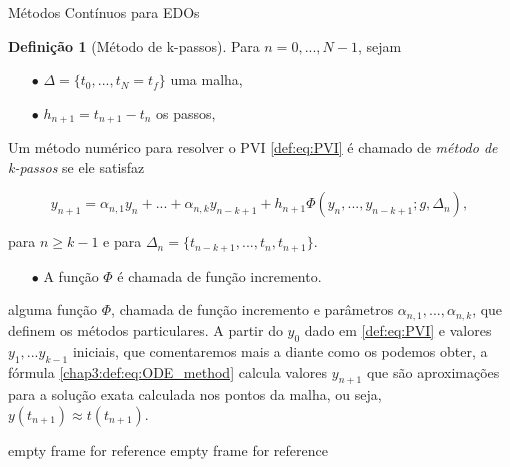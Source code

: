 \documentclass{beamer}
\theoremstyle{plain}
\theoremstyle{definition}
\newtheorem{defi}{Definição}
\begin{document}
\begin{frame}{Métodos Contínuos para EDOs}
    \small
    \begin{defi}[Método de k-passos]
        Para $n = 0, ..., N-1$, sejam

        \begin{itemize}
            \item[$\bullet$] $\Delta = \{ t_0, ..., t_N = t_f\}$ uma malha,

            \item[$\bullet$] $h_{n+1} = t_{n+1} - t_n$ os passos, 
        \end{itemize}

        Um método numérico para resolver o PVI \eqref{def:eq:PVI} é chamado de \textit{método de k-passos} se ele satisfaz 

        \begin{equation}
            y_{n+1} = \alpha_{n, 1} y_n + ... + \alpha_{n, k} y_{n - k + 1} + h_{n+1} \Phi( y_n, ..., y_{n-k+1}; g, \Delta_n), 
            \label{chap3:def:eq:ODE_method}
        \end{equation}

        para $n \geq k - 1$ e para $\Delta_n = \{ t_{n - k + 1}, ..., t_n, t_{n+1}\} $.

        \begin{itemize}
            \item[$\bullet$] A função $\Phi$ é chamada de função incremento.
        \end{itemize}
        alguma função $\Phi$, chamada de função incremento e parâmetros $\alpha_{n,1},..., \alpha_{n,k}$, que definem os métodos particulares. A partir do $y_0$ dado em  \eqref{def:eq:PVI} e valores $y_1,... y_{k-1}$ iniciais, que comentaremos mais a diante como os podemos obter, a fórmula  \eqref{chap3:def:eq:ODE_method}  calcula valores $y_{n+1}$ que são aproximações para a solução exata calculada nos pontos da malha, ou seja,  $y(t_{n+1}) \approx t(t_{n+1})$.
    \end{defi}
\end{frame}


\begin{frame}{empty frame for reference}
     empty frame for reference
\end{frame}

\end{document}
